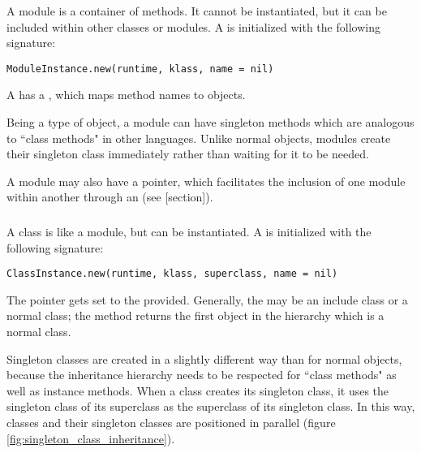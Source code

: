 A module is a container of methods. It cannot be instantiated, but it can be included within other classes or modules. A  is initialized with the following signature:

\begin{lstlisting}
ModuleInstance.new(runtime, klass, name = nil)
\end{lstlisting}

A  has a , which maps method names to  objects.

Being a type of object, a module can have singleton methods which are analogous to ``class methods" in other languages. Unlike normal objects, modules create their singleton class immediately rather than waiting for it to be needed.

A module may also have a  pointer, which facilitates the inclusion of one module within another through an  (see [section]).

\subsubsection{}

A class is like a module, but can be instantiated. A  is initialized with the following signature:

\begin{lstlisting}
ClassInstance.new(runtime, klass, superclass, name = nil)
\end{lstlisting}

The  pointer gets set to the  provided. Generally, the  may be an include class or a normal class; the  method returns the first object in the  hierarchy which is a normal class.

Singleton classes are created in a slightly different way than for normal objects, because the inheritance hierarchy needs to be respected for ``class methods" as well as instance methods. When a class creates its singleton class, it uses the singleton class of its superclass as the superclass of its singleton class. In this way, classes and their singleton classes are positioned in parallel (figure \ref{fig:singleton_class_inheritance}).

